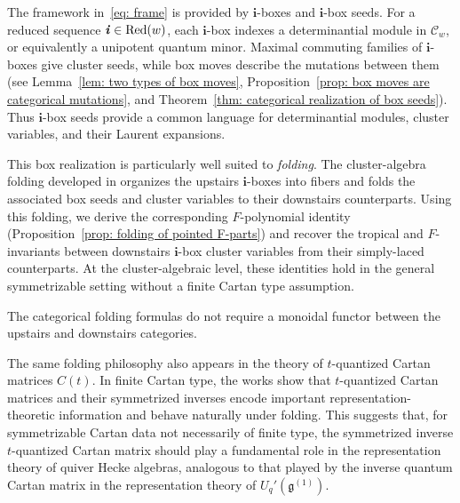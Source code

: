 \documentclass[12pt, leqno]{amsart}
\numberwithin{equation}{section}
\theoremstyle{plain}
\theoremstyle{definition}
\newcommand{\g}{\mathfrak{g}}
\newcommand{\ii}{ \textbf{\textit{i}}}
\newcommand{\bfi}{\mathbf{i}}
\newcommand{\scrC}{\mathscr{C}}
\newcommand{\Red}{\mathrm{Red}}
\begin{document}
\smallskip

The framework in~\eqref{eq: frame} is
provided by  \(\bfi\)-boxes and \(\bfi\)-box seeds.  
For a reduced sequence \(\ii\in\Red(w)\), each \(\bfi\)-box indexes a determinantial module in
\(\scrC_w\), or equivalently a unipotent quantum minor.  Maximal commuting families of \(\bfi\)-boxes give
cluster seeds, while box moves describe the mutations between them
\cite{KKOP24A,KK24} (see
Lemma~\ref{lem: two types of box moves},
Proposition~\ref{prop: box moves are categorical mutations}, and
Theorem~\ref{thm: categorical realization of box seeds}).  Thus
\(\bfi\)-box seeds provide a common
language for determinantial modules, cluster variables, and their
Laurent expansions. 

\smallskip

This box realization is particularly well suited to \emph{folding}.
The cluster-algebra folding developed in \cite{JO26} organizes the
upstairs \(\bfi\)-boxes into fibers and folds the associated box seeds
and cluster variables to their downstairs counterparts. Using this
folding, we derive the corresponding \(F\)-polynomial identity
(Proposition~\ref{prop: folding of pointed F-parts}) and recover the
tropical and \(F\)-invariants between downstairs \(\bfi\)-box cluster
variables from their simply-laced counterparts. At the
cluster-algebraic level, these identities hold in the general
symmetrizable setting without a finite Cartan type assumption.

\smallskip

The categorical folding formulas do not require a monoidal
functor between the upstairs and downstairs categories.

\smallskip

The same folding philosophy also appears in the theory of
\(t\)-quantized Cartan matrices $C(t)$.   In finite Cartan type, the works
\cite{KO23,KO24,JLO1,JLO2} show that \(t\)-quantized Cartan
matrices and their symmetrized inverses encode important representation-theoretic information and
behave naturally under folding.  This suggests that, for symmetrizable Cartan data not necessarily of
finite type, the symmetrized inverse \(t\)-quantized Cartan matrix
should play a fundamental role in the representation theory of
quiver Hecke algebras, analogous to that played by the inverse
quantum Cartan matrix in the representation theory of $U_q'(\g^{(1)})$.

\smallskip
\end{document}
